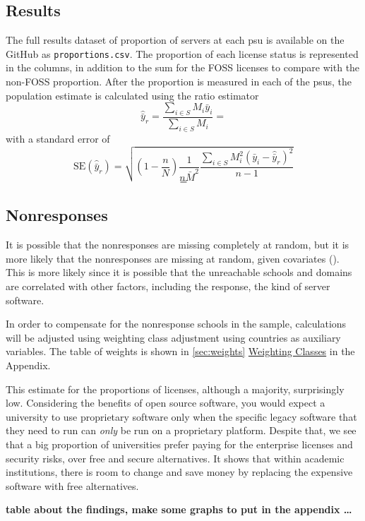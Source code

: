 \documentclass{article}
\theoremstyle{definition}
\begin{document}
\begin{flushleft}
\begin{multicols}{2}
\section{Results}
The full results dataset of proportion of servers at
each psu is available on the GitHub as \texttt{proportions.csv}.
The proportion of each license status is represented in the columns,
in addition to the sum for the FOSS licenses to compare with the
non-FOSS proportion. After the proportion is measured in each of
the psus, the population estimate is calculated using the
ratio estimator
$$
	\hat{\bar{y}}_r
	=
	\frac{
		\sum_{i \in S} M_i\bar{y}_i
	}{
		\sum_{i \in S} M_i
	}
	=
$$
with a standard error of
$$
	\textrm{SE}(\hat{\bar{y}}_r)
	=
	\sqrt{
		\left(
			1 - \frac{n}{N}
		\right)
		\frac{1}{n\bar{M}^2}
		\frac{
			\sum_{i \in S}M_i^2\left(\bar{y}_i-\hat{\bar{y}}_r\right)^2
		}{
			n-1
		}
	}
$$
$$
=
$$

\subsection{Nonresponses}
It is possible that the nonresponses are missing completely at random,
but it is more likely that the nonresponses are missing at random, given
covariates (\cite{lohr2019}). This is more likely since it is possible that
the unreachable schools and domains are correlated with other factors, including
the response, the kind of server software.

In order to compensate for the nonresponse schools
in the sample, calculations will be adjusted using weighting
class adjustment using countries as auxiliary variables. The table
of weights is shown in \autoref{sec:weights} \hyperref[sec:weights]{Weighting Classes}
in the Appendix.

This estimate for the proportions of licenses, although a majority, surprisingly
low. Considering the benefits of open source software, you would expect a
university to use proprietary software only when the specific legacy software
that they need to run can \textit{only} be run on a proprietary platform.
Despite that, we see that a big proportion of universities prefer paying for the
enterprise licenses and security risks, over free and secure alternatives. It shows
that within academic institutions, there is room to change and save money by
replacing the expensive software with free alternatives.

\textbf{table about the findings, make some graphs to put in the appendix \dots}



\end{multicols}
\end{flushleft}
\end{document}
